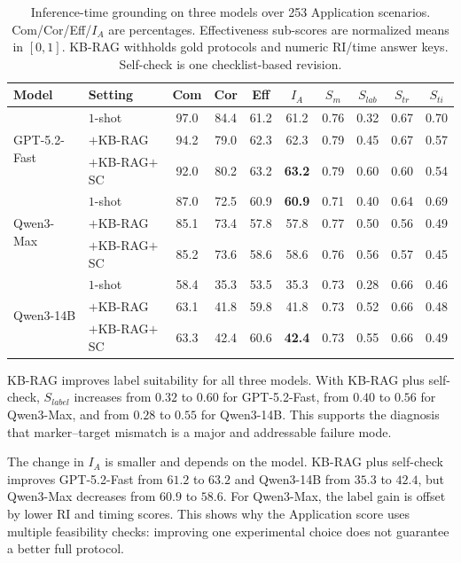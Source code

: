 \documentclass[conference]{IEEEtran}
\begin{document}
\begin{table}[!t]
\centering
\small
\setlength{\tabcolsep}{5pt}
\caption{Inference-time grounding on three models over 253 Application
scenarios. Com/Cor/Eff/$I_A$ are percentages. Effectiveness sub-scores are
normalized means in $[0,1]$. KB-RAG withholds gold protocols and numeric RI/time
answer keys. Self-check is one checklist-based revision.}
\label{tab:inference_time}
\begin{tabular}{llcccc cccc}
\toprule
Model & Setting & Com & Cor & Eff & $I_A$ & $S_{m}$ & $S_{lab}$ & $S_{tr}$ & $S_{ti}$ \\
\midrule
\multirow{3}{*}{GPT-5.2-Fast}
 & $1$-shot       & 97.0 & 84.4 & 61.2 & 61.2 & 0.76 & 0.32 & 0.67 & 0.70 \\
 & $+$KB-RAG      & 94.2 & 79.0 & 62.3 & 62.3 & 0.79 & 0.45 & 0.67 & 0.57 \\
 & $+$KB-RAG$+$SC & 92.0 & 80.2 & 63.2 & \textbf{63.2} & 0.79 & 0.60 & 0.60 & 0.54 \\
\midrule
\multirow{3}{*}{Qwen3-Max}
 & $1$-shot       & 87.0 & 72.5 & 60.9 & \textbf{60.9} & 0.71 & 0.40 & 0.64 & 0.69 \\
 & $+$KB-RAG      & 85.1 & 73.4 & 57.8 & 57.8 & 0.77 & 0.50 & 0.56 & 0.49 \\
 & $+$KB-RAG$+$SC & 85.2 & 73.6 & 58.6 & 58.6 & 0.76 & 0.56 & 0.57 & 0.45 \\
\midrule
\multirow{3}{*}{Qwen3-14B}
 & $1$-shot       & 58.4 & 35.3 & 53.5 & 35.3 & 0.73 & 0.28 & 0.66 & 0.46 \\
 & $+$KB-RAG      & 63.1 & 41.8 & 59.8 & 41.8 & 0.73 & 0.52 & 0.66 & 0.48 \\
 & $+$KB-RAG$+$SC & 63.3 & 42.4 & 60.6 & \textbf{42.4} & 0.73 & 0.55 & 0.66 & 0.49 \\
\bottomrule
\end{tabular}
\end{table}

KB-RAG improves label suitability for all three models. With KB-RAG plus
self-check, $S_{label}$ increases from $0.32$ to $0.60$ for GPT-5.2-Fast, from
$0.40$ to $0.56$ for Qwen3-Max, and from $0.28$ to $0.55$ for Qwen3-14B. This
supports the diagnosis that marker--target mismatch is a major and addressable
failure mode.

The change in $I_A$ is smaller and depends on the model. KB-RAG plus self-check
improves GPT-5.2-Fast from $61.2$ to $63.2$ and Qwen3-14B from $35.3$ to
$42.4$, but Qwen3-Max decreases from $60.9$ to $58.6$. For Qwen3-Max, the label
gain is offset by lower RI and timing scores. This shows why the Application
score uses multiple feasibility checks: improving one experimental choice does
not guarantee a better full protocol.
\end{document}
